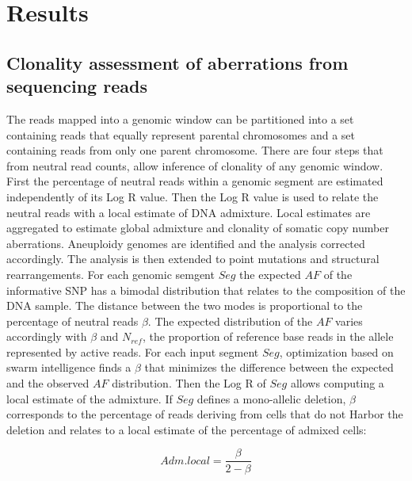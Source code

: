 \section{Results}

	\subsection{Clonality assessment of aberrations from sequencing reads}
	The reads mapped into a genomic window can be partitioned into a set containing reads that equally represent parental chromosomes and a set containing reads from only one parent chromosome.
	There are four steps that from neutral read counts, allow inference of clonality of any genomic window.
	First the percentage of neutral reads within a genomic segment are estimated independently of its Log R value.
	Then the Log R value is used to relate the neutral reads with a local estimate of DNA admixture.
	Local estimates are aggregated to estimate global admixture and clonality of somatic copy number aberrations.
	Aneuploidy genomes are identified and the analysis corrected accordingly.
	The analysis  is then extended to point mutations and structural rearrangements.
	For each genomic semgent $Seg$ the expected $AF$ of the informative SNP has a bimodal distribution that relates to the composition of the DNA sample.
	The distance between the two modes is proportional to the percentage of neutral reads $\beta$.
	The expected distribution of the $AF$ varies accordingly with $\beta$ and $N_{ref}$, the proportion of reference base reads in the allele represented by active reads.
	For each input segment $Seg$, optimization based on swarm intelligence finds a $\beta$ that minimizes the difference between the expected and the observed $AF$ distribution.
	Then the Log R of $Seg$ allows computing a local estimate of the admixture.
	If $Seg$ defines a mono-allelic deletion, $\beta$ corresponds to the percentage of reads deriving from cells that do not Harbor the deletion and relates to a local estimate of the percentage of admixed cells:

	$$Adm.local = \frac{\beta}{2-\beta}$$

